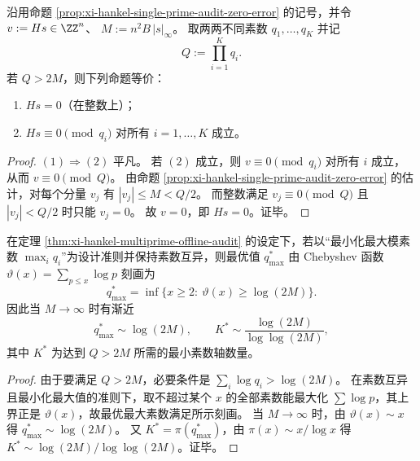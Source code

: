 \begin{theorem}\label{thm:xi-hankel-multiprime-offline-audit}
沿用命题 \ref{prop:xi-hankel-single-prime-audit-zero-error} 的记号，并令
\(
v:=Hs\in\ZZ^n
\)、
\(
M:=n^2B\,|s|_\infty
\)。
取两两不同素数 \(q_1,\dots,q_K\) 并记
\[
Q:=\prod_{i=1}^{K}q_i.
\]
若 \(Q>2M\)，则下列命题等价：
\begin{enumerate}
  \item \(Hs=0\)（在整数上）；
  \item \(Hs\equiv 0\pmod{q_i}\) 对所有 \(i=1,\dots,K\) 成立。
\end{enumerate}
\end{theorem}
\begin{proof}
\((1)\Rightarrow(2)\) 平凡。
若 \((2)\) 成立，则 \(v\equiv 0\pmod{q_i}\) 对所有 \(i\) 成立，从而 \(v\equiv 0\pmod Q\)。
由命题 \ref{prop:xi-hankel-single-prime-audit-zero-error} 的估计，对每个分量 \(v_j\) 有 \(|v_j|\le M<Q/2\)。
而整数满足 \(v_j\equiv 0\pmod Q\) 且 \(|v_j|<Q/2\) 时只能 \(v_j=0\)。
故 \(v=0\)，即 \(Hs=0\)。证毕。
\end{proof}

\begin{corollary}[最大模素数受限时的最优对数尺度]\label{cor:xi-hankel-offline-audit-max-prime-logscale}
在定理 \ref{thm:xi-hankel-multiprime-offline-audit} 的设定下，若以“最小化最大模素数 \(\max_i q_i\)”为设计准则并保持素数互异，则最优值 \(q_{\max}^\ast\) 由 Chebyshev 函数
\(
\vartheta(x)=\sum_{p\le x}\log p
\)
刻画为
\[
q_{\max}^\ast=\inf\{x\ge 2:\ \vartheta(x)\ge \log(2M)\}.
\]
因此当 \(M\to\infty\) 时有渐近
\[
q_{\max}^\ast\sim \log(2M),
\qquad
K^\ast\sim \frac{\log(2M)}{\log\log(2M)},
\]
其中 \(K^\ast\) 为达到 \(Q>2M\) 所需的最小素数轴数量。
\end{corollary}
\begin{proof}
由于要满足 \(Q>2M\)，必要条件是 \(\sum_i\log q_i>\log(2M)\)。
在素数互异且最小化最大值的准则下，取不超过某个 \(x\) 的全部素数能最大化 \(\sum\log p\)，其上界正是 \(\vartheta(x)\)，故最优最大素数满足所示刻画。
当 \(M\to\infty\) 时，由 \(\vartheta(x)\sim x\) 得 \(q_{\max}^\ast\sim \log(2M)\)。
又 \(K^\ast=\pi(q_{\max}^\ast)\)，由 \(\pi(x)\sim x/\log x\) 得 \(K^\ast\sim \log(2M)/\log\log(2M)\)。证毕。
\end{proof}



